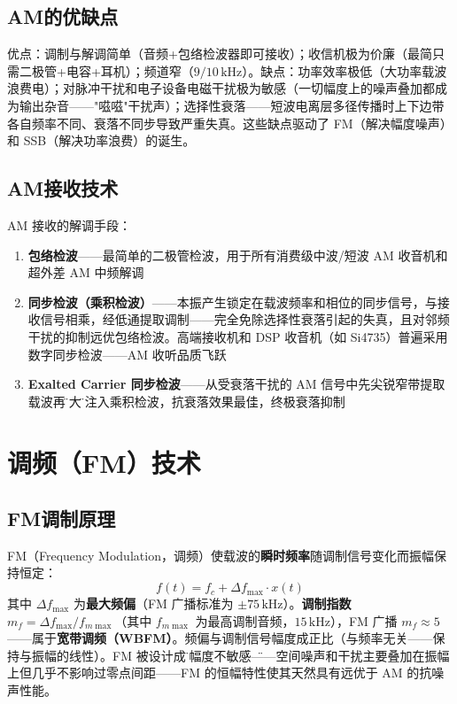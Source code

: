 \documentclass[12pt,UTF8]{ctexbook}
\begin{document}
\subsection{AM的优缺点}

优点：调制与解调简单（音频+包络检波器即可接收）；收信机极为价廉（最简只需二极管+电容+耳机）；频道窄（$9/10\,\mathrm{kHz}$）。缺点：功率效率极低（大功率载波浪费电）；对脉冲干扰和电子设备电磁干扰极为敏感（一切幅度上的噪声叠加都成为输出杂音——"嗞嗞"干扰声）；选择性衰落——短波电离层多径传播时上下边带各自频率不同、衰落不同步导致严重失真。这些缺点驱动了 FM（解决幅度噪声）和 SSB（解决功率浪费）的诞生。

\subsection{AM接收技术}

AM 接收的解调手段：
\begin{enumerate}
\item \textbf{包络检波}——最简单的二极管检波，用于所有消费级中波/短波 AM 收音机和超外差 AM 中频解调
\item \textbf{同步检波（乘积检波）}——本振产生锁定在载波频率和相位的同步信号，与接收信号相乘，经低通提取调制——完全免除选择性衰落引起的失真，且对邻频干扰的抑制远优包络检波。高端接收机和 DSP 收音机（如 Si4735）普遍采用数字同步检波——AM 收听品质飞跃
\item \textbf{Exalted Carrier 同步检波}——从受衰落干扰的 AM 信号中先尖锐窄带提取载波再\"放大\"后注入乘积检波，抗衰落效果最佳，终极衰落抑制
\end{enumerate}

\section{调频（FM）技术}
\label{sec:fm_technology}

\subsection{FM调制原理}

FM（Frequency Modulation，调频）使载波的\textbf{瞬时频率}随调制信号变化而振幅保持恒定：
\[
f(t) = f_c + \Delta f_{\max} \cdot x(t)
\]
其中 $\Delta f_{\max}$ 为\textbf{最大频偏}（FM 广播标准为 $\pm 75\,\mathrm{kHz}$）。\textbf{调制指数} $m_f = \Delta f_{\max}/f_{m\max}$（其中 $f_{m\max}$ 为最高调制音频，$15\,\mathrm{kHz}$），FM 广播 $m_f\approx 5$——属于\textbf{宽带调频（WBFM）}。频偏与调制信号幅度成正比（与频率无关——保持与振幅的线性）。FM 被设计成\"对幅度不敏感\"——空间噪声和干扰主要叠加在振幅上但几乎不影响过零点间距——FM 的恒幅特性使其天然具有远优于 AM 的抗噪声性能。
\end{document}
